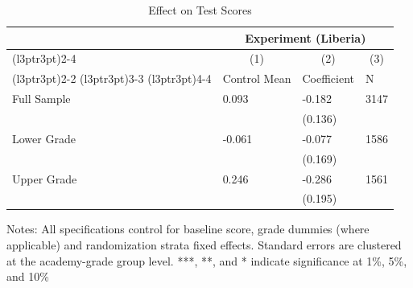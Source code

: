 \begin{table}[!h]
\centering
\caption{Effect on Test Scores}
\centering
\begin{threeparttable}
\begin{tabular}[t]{llll}
\toprule
\multicolumn{1}{c}{ } & \multicolumn{3}{c}{Experiment (Liberia)} \\
\cmidrule(l{3pt}r{3pt}){2-4}
\multicolumn{1}{c}{ } & \multicolumn{1}{c}{(1)} & \multicolumn{1}{c}{(2)} & \multicolumn{1}{c}{(3)} \\
\cmidrule(l{3pt}r{3pt}){2-2} \cmidrule(l{3pt}r{3pt}){3-3} \cmidrule(l{3pt}r{3pt}){4-4}
 & Control Mean & Coefficient & N\\
\midrule
Full Sample & 0.093 & -0.182 & 3147\\
 &  & (0.136) & \\
Lower Grade & -0.061 & -0.077 & 1586\\
 &  & (0.169) & \\
Upper Grade & 0.246 & -0.286 & 1561\\
 &  & (0.195) & \\
\bottomrule
\end{tabular}
\begin{tablenotes}[para]
\item Notes: All specifications control for baseline score, grade dummies (where applicable) and randomization strata fixed effects. Standard errors are clustered at the academy-grade group level. ***, **, and * indicate significance at 1\%, 5\%, and 10\%
\end{tablenotes}
\end{threeparttable}
\end{table}
